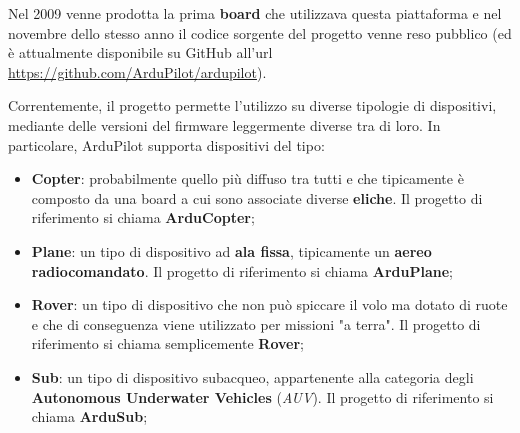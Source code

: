 \documentclass[a4paper, 12pt, oneside]{article}
\begin{document}
Nel 2009 venne prodotta la prima \textbf{board} che utilizzava questa piattaforma e nel novembre dello stesso anno il codice sorgente del progetto venne reso pubblico (ed è attualmente disponibile su GitHub all'url \url{https://github.com/ArduPilot/ardupilot})\cite{ardupilot-history}.

Correntemente, il progetto permette l'utilizzo su diverse tipologie di dispositivi, mediante delle versioni del firmware leggermente diverse tra di loro. In particolare, ArduPilot supporta dispositivi del tipo:

\begin{itemize}
    \item \textbf{Copter}: probabilmente quello più diffuso tra tutti e che tipicamente è composto da una board a cui sono associate diverse \textbf{eliche}. Il progetto di riferimento si chiama \textbf{ArduCopter}\cite{arducopter};
    \item \textbf{Plane}: un tipo di dispositivo ad \textbf{ala fissa}, tipicamente un \textbf{aereo radiocomandato}. Il progetto di riferimento si chiama \textbf{ArduPlane}\cite{arduplane};
    \item \textbf{Rover}: un tipo di dispositivo che non può spiccare il volo ma dotato di ruote e che di conseguenza viene utilizzato per missioni "a terra". Il progetto di riferimento si chiama semplicemente \textbf{Rover}\cite{rover};
    \item \textbf{Sub}: un tipo di dispositivo subacqueo, appartenente alla categoria degli \textbf{Autonomous Underwater Vehicles} (\textit{AUV}). Il progetto di riferimento si chiama \textbf{ArduSub}\cite{ardusub};
\end{itemize}
\end{document}
